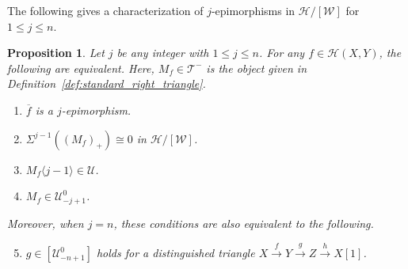 \documentclass[a4paper,reqno,10pt]{amsart}
\newtheorem{proposition}[proposition]{Proposition}
\theoremstyle{definition}
\theoremstyle{definition}
\theoremstyle{definition}
\theoremstyle{definition}
\theoremstyle{plain}
\newcommand{\ovl}[1]{\overline{#1}}
\newcommand{\CH}{\mathcal{H}}
\newcommand{\CT}{\mathcal{T}}
\newcommand{\CU}{\mathcal{U}}
\newcommand{\CW}{\mathcal{W}}
\begin{document}
The following gives a characterization of $j$-epimorphisms in $\CH/[\CW]$ for $1\le j\le n$.
\begin{proposition}\label{prop:equivalence_Sigma_epi}
Let $j$ be any integer with $1\le j\le n$. For any $f\in\CH(X,Y)$, the following are equivalent. Here, $M_f\in\CT^-$ is the object given in Definition~\ref{def:standard_right_triangle}. 
\begin{enumerate}
\item $\ovl{f}$ is a $j$-epimorphism.
\item $\Sigma^{j-1}((M_f)_+)\cong 0$ in $\CH/[\CW]$.
\item $M_f\langle j-1\rangle\in\CU$.
\item $M_f\in\CU_{-j+1}^0$.
\end{enumerate}

Moreover, when $j=n$, these conditions are also equivalent to the following.
\begin{enumerate}\setcounter{enumi}{4}
\item $g\in [\CU_{-n+1}^0]$ holds for a distinguished triangle $X\xrightarrow{f}Y\xrightarrow{g}Z\xrightarrow{h} X[1]$.
\end{enumerate}
\end{proposition}
\end{document}

